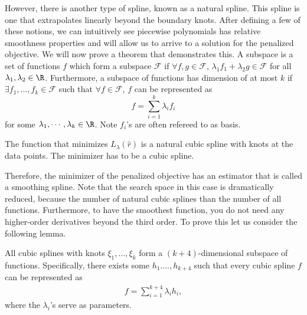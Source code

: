 However, there is another type of spline, known as a natural spline. This spline is one that extrapolates linearly beyond the boundary knots. After defining a few of these notions, we can intuitively see piecewise polynomials has relative smoothness properties and will allow us to arrive to a solution for the penalized objective. We will now prove a theorem that demonstrates this. 
        A subspace is a set of functions $f$ which form a subspace $\mathcal{F}$  if $\forall f,g \in \mathcal{F}$, $\lambda_1f_1 + \lambda_2g \in \mathcal{F}$ for all $\lambda_1, \lambda_2 \in \R$.
        Furthermore, a subspace of functions has dimension of at most $k$ if $\exists f_1, ...,f_k \in \mathcal{F}$ such that $\forall f \in \mathcal{F}$, $f$ can be represented as \[
        f = \sum_{i = 1}^{k}\lambda_if_i
        \]
        for some $\lambda_1, \cdots, \lambda_k \in \R$.  Note $f_i$'s are often refereed to as basis.
\begin{theorem} The function that minimizes $L_{\lambda}(\hat{r})$ is a natural cubic spline with knots at the data points. The minimizer has to be a cubic spline. 
\end{theorem}
Therefore, the minimizer of the penalized objective has an estimator that is called a smoothing spline. Note that the search space in this case is dramatically reduced, because the number of natural cubic splines than the number of all functions. Furthermore, to have the smoothest function, you do not need any higher-order derivatives beyond the third order. To prove this let us consider the following lemma.
\begin{lemma} All cubic splines with knots $\xi_1,...,\xi_k$ form a $(k+4)$-dimensional subspace of functions. Specifically, there exists some $h_1. ..., h_{k+4}$ such that every cubic spline $f$ can be represented as 
	\begin{align*}
		f = \sum_{i=1}^{k+4}\lambda_i h_i,
	\end{align*}
where the $\lambda_i$'s serve as parameters. 
\end{lemma}


